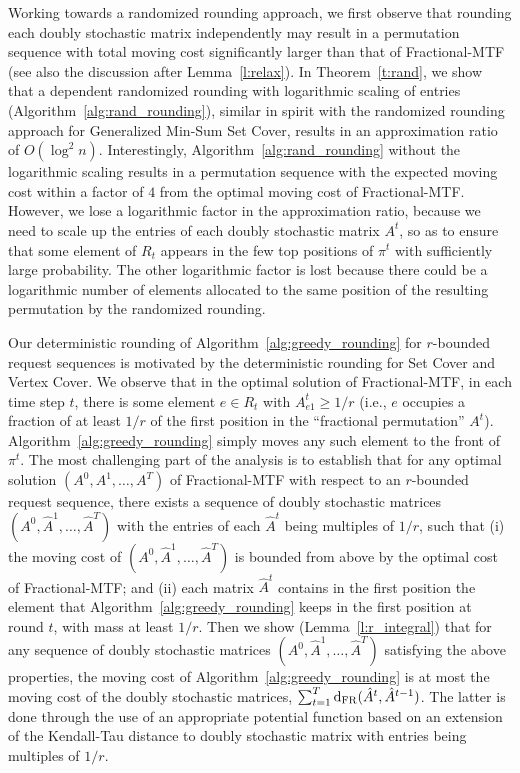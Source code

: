 Working towards a randomized rounding approach, we first observe that rounding each doubly stochastic matrix independently may result in a permutation sequence with total moving cost significantly larger than that of Fractional-MTF (see also the discussion after Lemma~\ref{l:relax}). In Theorem~\ref{t:rand}, we show that a dependent randomized rounding with  logarithmic scaling of entries  (Algorithm~\ref{alg:rand_rounding}), similar in spirit with the randomized rounding approach \cite{BGK10,SW11} for Generalized Min-Sum Set Cover, results in an approximation ratio of $O(\log^2 n)$. Interestingly, Algorithm~\ref{alg:rand_rounding} without the logarithmic scaling results in a permutation sequence with the expected moving cost within a factor of $4$ from the optimal moving cost of Fractional-MTF. However, we lose a logarithmic factor in the approximation ratio, because we need to scale up the entries of each doubly stochastic matrix $A^t$, so as to ensure that some element of $R_t$ appears in the few top positions of $\pi^t$ with sufficiently large probability. The other logarithmic factor is lost because there could be a logarithmic number of elements allocated to the same position of the resulting permutation by the randomized rounding. 

Our deterministic rounding of Algorithm~\ref{alg:greedy_rounding} for $r$-bounded request sequences is motivated by the deterministic rounding for Set Cover and Vertex Cover. We observe that in the optimal solution of Fractional-MTF, in each time step $t$, there is some element $e \in R_t$ with $A^{t}_{e1} \geq 1/r$ (i.e., $e$ occupies a fraction of at least $1/r$ of the first position in the ``fractional permutation'' $A^t$). Algorithm~\ref{alg:greedy_rounding} simply moves any such element to the front of $\pi^t$. The most challenging part of the analysis is to establish that for any optimal solution $(A^0, A^1, \ldots, A^T)$ of Fractional-MTF with respect to an $r$-bounded request sequence, there exists a sequence of doubly stochastic matrices $(A^0, \hat{A}^1, \ldots, \hat{A}^T)$ with the entries of each $\hat{A}^t$ being multiples of $1/r$, such that (i) the moving cost of $(A^0, \hat{A}^1, \ldots, \hat{A}^T)$ is bounded from above by the optimal cost of Fractional-MTF; and (ii) each matrix $\hat{A}^t$ contains in the first position the element that Algorithm~\ref{alg:greedy_rounding} keeps in the first position at round $t$, with mass at least $1/r$. Then we show (Lemma~\ref{l:r_integral}) that for any sequence of doubly stochastic matrices $(A^0, \hat{A}^1, \ldots, \hat{A}^T)$ satisfying the above properties, the moving cost of Algorithm~\ref{alg:greedy_rounding} is at most the moving cost of the doubly stochastic matrices,
$\sum_{t=1}^T \mathrm{d}_{\mathrm{FR}}(\hat{A}^t,\hat{A}^{t-1})$. The latter is done through the use of an appropriate potential function based on an extension of the Kendall-Tau distance to doubly stochastic matrix with entries being multiples of $1/r$.

